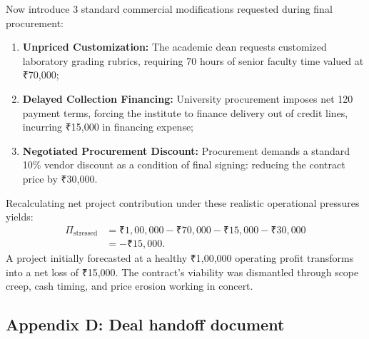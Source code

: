 Now introduce 3 standard commercial modifications requested during final procurement:
\begin{enumerate}
\item \textbf{Unpriced Customization:} The academic dean requests customized laboratory grading rubrics, requiring 70 hours of senior faculty time valued at ₹70,000;
\item \textbf{Delayed Collection Financing:} University procurement imposes net 120 payment terms, forcing the institute to finance delivery out of credit lines, incurring ₹15,000 in financing expense;
\item \textbf{Negotiated Procurement Discount:} Procurement demands a standard 10\% vendor discount as a condition of final signing: reducing the contract price by ₹30,000.
\end{enumerate}

Recalculating net project contribution under these realistic operational pressures yields:
\begin{equation}
\begin{aligned}
\Pi_{\text{stressed}} &= ₹1,00,000 - ₹70,000 - ₹15,000 - ₹30,000 \\
&= -₹15,000.
\end{aligned}
\end{equation}
A project initially forecasted at a healthy ₹1,00,000 operating profit transforms into a net loss of ₹15,000. The contract's viability was dismantled through scope creep, cash timing, and price erosion working in concert.

\subsection*{Appendix D: Deal handoff document}


